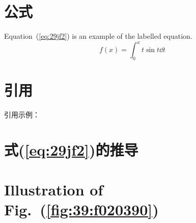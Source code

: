 \documentclass{article}
\begin{document}
\section{公式}
Equation~(\ref{eq:29jf2}) is an example of the labelled equation.
\begin{equation}
    f(x) = \int_0^x t\sin t \dd t
    \label{eq:29jf2}
\end{equation}

\section{引用}
引用示例：\cite{Zhong2020InsertionLossThin}



\begin{appendices}

\section{式(\ref{eq:29jf2})的推导}
\lipsum[1]

\lipsum[1]

\lipsum[1]

\section{Illustration of Fig.~(\ref{fig:39:f020390})}
\lipsum[1]

\lipsum[1]
\end{appendices}


\printbibliography[title=参考文献]
\end{document}
